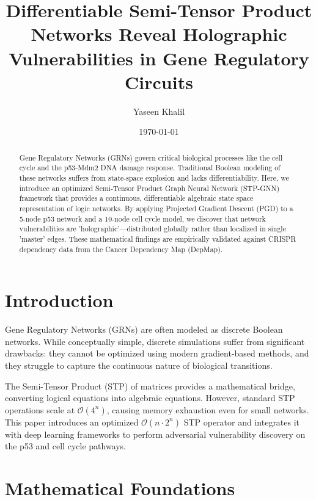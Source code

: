 \documentclass[11pt,a4paper]{article}
\title{Differentiable Semi-Tensor Product Networks Reveal Holographic Vulnerabilities in Gene Regulatory Circuits}
\author[1]{Yaseen Khalil}
\affil[1]{AI Architect, Independent Researcher}
\date{\today}
\begin{document}
\maketitle

\begin{abstract}
Gene Regulatory Networks (GRNs) govern critical biological processes like the cell cycle and the p53-Mdm2 DNA damage response. Traditional Boolean modeling of these networks suffers from state-space explosion and lacks differentiability. Here, we introduce an optimized Semi-Tensor Product Graph Neural Network (STP-GNN) framework that provides a continuous, differentiable algebraic state space representation of logic networks. By applying Projected Gradient Descent (PGD) to a 5-node p53 network and a 10-node cell cycle model, we discover that network vulnerabilities are 'holographic'—distributed globally rather than localized in single 'master' edges. These mathematical findings are empirically validated against CRISPR dependency data from the Cancer Dependency Map (DepMap).
\end{abstract}

\section{Introduction}
Gene Regulatory Networks (GRNs) are often modeled as discrete Boolean networks. While conceptually simple, discrete simulations suffer from significant drawbacks: they cannot be optimized using modern gradient-based methods, and they struggle to capture the continuous nature of biological transitions. 

The Semi-Tensor Product (STP) of matrices provides a mathematical bridge, converting logical equations into algebraic equations. However, standard STP operations scale at $\mathcal{O}(4^n)$, causing memory exhaustion even for small networks. This paper introduces an optimized $\mathcal{O}(n \cdot 2^n)$ STP operator and integrates it with deep learning frameworks to perform adversarial vulnerability discovery on the p53 and cell cycle pathways.

\section{Mathematical Foundations}
\end{document}
